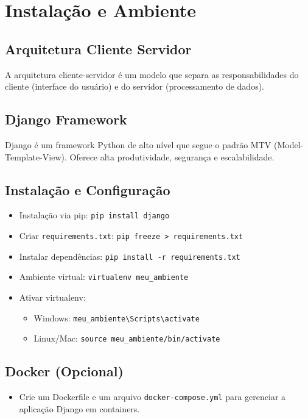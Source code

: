 

\chapter{Instala\c{c}\~ao e Ambiente}
\section{Arquitetura Cliente Servidor}
A arquitetura cliente-servidor \'{e} um modelo que separa as responsabilidades do cliente (interface do usu\'ario) e do servidor (processamento de dados).

\section{Django Framework}
Django \'{e} um framework Python de alto n\'{i}vel que segue o padr\~ao MTV (Model-Template-View). Oferece alta produtividade, seguran\c{c}a e escalabilidade.

\section{Instala\c{c}\~ao e Configura\c{c}\~ao}
\begin{itemize}
  \item Instala\c{c}\~ao via pip: \texttt{pip install django}
  \item Criar \texttt{requirements.txt}: \texttt{pip freeze > requirements.txt}
  \item Instalar depend\^encias: \texttt{pip install -r requirements.txt}
  \item Ambiente virtual: \texttt{virtualenv meu\_ambiente}
  \item Ativar virtualenv:
    \begin{itemize}
      \item Windows: \texttt{meu\_ambiente\textbackslash Scripts\textbackslash activate}
      \item Linux/Mac: \texttt{source meu\_ambiente/bin/activate}
    \end{itemize}
\end{itemize}

\section{Docker (Opcional)}
\begin{itemize}
  \item Crie um Dockerfile e um arquivo \texttt{docker-compose.yml} para gerenciar a aplica\c{c}\~ao Django em containers.
\end{itemize}

